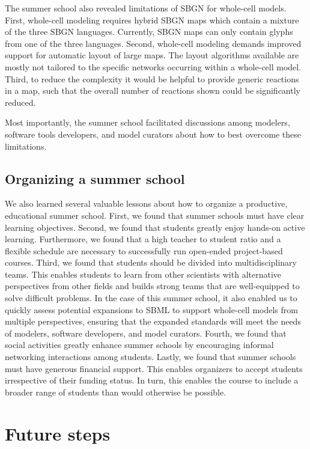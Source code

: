 \documentclass[journal,transmag]{IEEEtran}
\begin{document}
The summer school also revealed  limitations of SBGN for whole-cell models. 
First, whole-cell modeling requires hybrid SBGN maps which contain a mixture of the three SBGN languages.
Currently, SBGN maps can only contain glyphs from one of the three languages. 
Second, whole-cell modeling demands improved support for automatic layout of large maps. The layout algorithms available are mostly not tailored to the specific networks occurring within a whole-cell model. 
Third, to reduce the complexity it would be helpful to provide generic reactions in  a map, such that the overall number of reactions shown could be significantly reduced. 

Most importantly, the summer school facilitated discussions among modelers, software tools developers, and model curators about how to best overcome these limitations.

\subsection{Organizing a summer school}
We also learned several valuable lessons about how to organize a productive, educational summer school.
First, we found that summer schools must have clear learning objectives.
Second, we found that students greatly enjoy hands-on active learning. 
Furthermore, we found that a high teacher to student ratio and a flexible schedule are necessary to successfully run open-ended project-based courses.
Third, we found that students should be divided into multidisciplinary teams. 
This enables students to learn from other scientists with alternative perspectives from other fields and builds strong teams that are well-equipped to solve difficult problems.
In the case of this summer school, it also enabled us to quickly assess potential expansions to SBML to support whole-cell models from multiple perspectives, ensuring that the expanded standards will meet the needs of modelers, software developers, and model curators.
Fourth, we found that social activities greatly enhance summer schools by encouraging informal networking interactions among students.
Lastly, we found that summer schools must have generous financial support. This enables organizers to accept students irrespective of their funding status. In turn, this enables the course to include a broader range of students than would otherwise be possible.

\section{Future steps}
\end{document}
